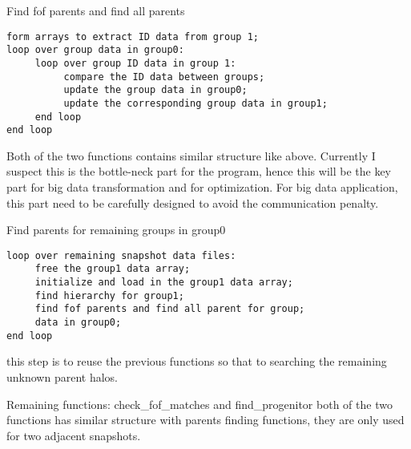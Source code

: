 \documentclass[notheorems, aspectratio=54]{beamer}
\begin{document}
\begin{frame}[fragile]

\begin{block}{Find fof parents and find all parents}
 \begin{verbatim}
form arrays to extract ID data from group 1;
loop over group data in group0:
     loop over group ID data in group 1:
          compare the ID data between groups;
          update the group data in group0;
          update the corresponding group data in group1;
     end loop
end loop
 \end{verbatim}
\end{block}
Both of the two functions contains similar structure like above. Currently I suspect this is the bottle-neck part for the program, hence this will be the key part for big data transformation and for optimization. For big data application, this part need to be carefully designed to avoid the communication penalty.

\end{frame}

\begin{frame}[fragile]

\begin{block}{Find parents for remaining groups in group0}
 \begin{verbatim}
loop over remaining snapshot data files:
     free the group1 data array;
     initialize and load in the group1 data array;
     find hierarchy for group1;
     find fof parents and find all parent for group; 
     data in group0;
end loop
 \end{verbatim}
\end{block}
this step is to reuse the previous functions so that to searching the remaining unknown parent halos.

\end{frame}

\begin{frame}[fragile]

\begin{block}{Remaining functions: check\_fof\_matches and find\_progenitor}
both of the two functions has similar structure with parents finding functions, they are only used for two adjacent snapshots.
\end{block}

\end{frame}
\end{document}
